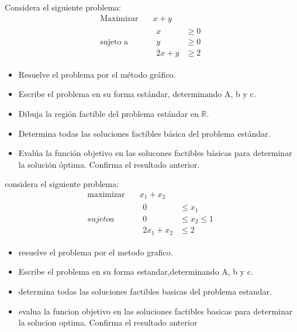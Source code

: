 \documentclass{article}
\begin{document}
Considera el siguiente problema:
\begin{equation*}
  \begin{aligned}
    \text{Maximizar}\quad & x+y \\
    \text{sujeto a}\quad &
    \begin{aligned}
      x & \geq 0\\
      y & \geq 0\\
      2x + y & \geq 2
    \end{aligned}
  \end{aligned}
\end{equation*}
\begin{itemize}
  \item Resuelve el problema por el método gráfico.\\
  \item Escribe el problema en su forma estándar, determinando A, b y c.\\
  \item Dibuja la región factible del problema estándar en $\mathbb{R}$.\\
  \item Determina todas las soluciones factibles básica del problema estándar.\\
  \item Evalúa la función objetivo en las solucones factibles básicas para determinar la solución óptima. Confirma el resultado anterior.
 \end{itemize}
 
 considera el siguiente problema:
\begin{equation}
\begin{aligned}
  \text{maximizar}\quad & x_1+x_2\\
  sujeto a \quad &
  \begin{aligned}
    0&\leq x_1\\
    0&\leq x_2\leq1\\
    2x_1+x_2& \leq2
    \end{aligned}
\end{aligned}
\end{equation}

\begin{itemize}

  \item resuelve el problema por el metodo grafico.
  \item Escribe el problema en su forma estandar,determinando A, b y c.
  \item determina todas las soluciones factibles basicas del problema estandar.
  \item evalua la funcion objetivo en las soluciones factibles basicas para determinar la solucion optima. Confirma el resultado anterior
 \end{itemize}
 
 
\end{document}
